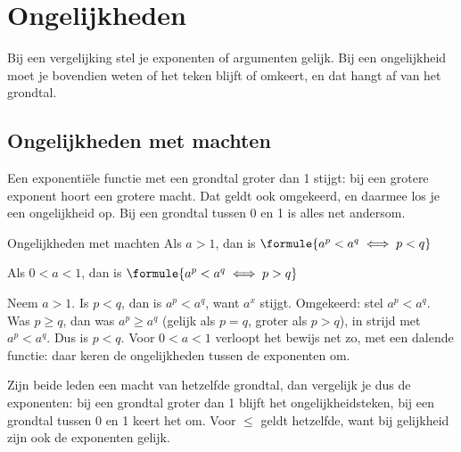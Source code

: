 \begin{oefeningen}
\end{oefeningen}

\section{Ongelijkheden}

Bij een vergelijking stel je exponenten of argumenten gelijk. Bij een ongelijkheid moet je bovendien weten of het teken blijft of omkeert, en dat hangt af van het grondtal.

\subsection{Ongelijkheden met machten}

Een exponentiële functie met een grondtal groter dan 1 stijgt: bij een grotere exponent hoort een grotere macht. Dat geldt ook omgekeerd, en daarmee los je een ongelijkheid op. Bij een grondtal tussen 0 en 1 is alles net andersom.

\begin{theorie}
\begin{stelling}{Ongelijkheden met machten}
Als $a > 1$, dan is \qquad $\formule{a^p < a^q \iff p < q}$

Als $0 < a < 1$, dan is \qquad $\formule{a^p < a^q \iff p > q}$
\end{stelling}
\begin{bewijs}
Neem $a > 1$. Is $p < q$, dan is $a^p < a^q$, want $a^x$ stijgt. Omgekeerd: stel $a^p < a^q$. Was $p \geqslant q$, dan was $a^p \geqslant a^q$ (gelijk als $p = q$, groter als $p > q$), in strijd met $a^p < a^q$. Dus is $p < q$. Voor $0 < a < 1$ verloopt het bewijs net zo, met een dalende functie: daar keren de ongelijkheden tussen de exponenten om.
\end{bewijs}
\end{theorie}

Zijn beide leden een macht van hetzelfde grondtal, dan vergelijk je dus de exponenten: bij een grondtal groter dan 1 blijft het ongelijkheidsteken, bij een grondtal tussen 0 en 1 keert het om. Voor $\leqslant$ geldt hetzelfde, want bij gelijkheid zijn ook de exponenten gelijk.



